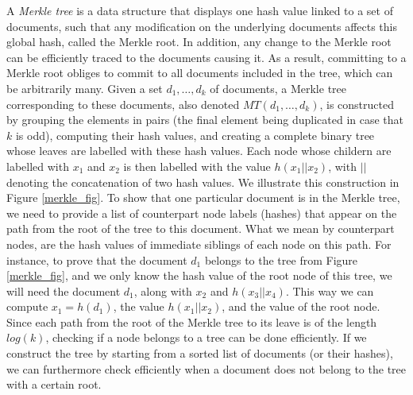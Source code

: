 A {\em Merkle tree} is a data structure that displays one hash value linked to a set of documents, such that any modification on the underlying documents affects this global hash, called the Merkle root. In addition, any change to the Merkle root can be efficiently traced to the documents causing it. As a result, committing to a Merkle root obliges to commit to all documents included in the tree, which can be arbitrarily many. Given a set $d_1,\ldots ,d_k$ of documents, a Merkle tree corresponding to these documents, also denoted $MT(d_1,\ldots ,d_k)$, is constructed by grouping the elements in pairs (the final element being duplicated in case that $k$ is odd), computing their hash values, and creating a complete binary tree whose leaves are labelled with these hash values. Each node whose childern are labelled with $x_1$ and $x_2$ is then labelled with the value $h(x_1 || x_2)$, with $||$ denoting the concatenation of two hash values. We illustrate this construction in Figure \ref{merkle_fig}. To show that one particular document is in the Merkle tree, we need to provide a list of counterpart node labels (hashes) that appear on the path from the root of the tree to this document. What we mean by counterpart nodes, are the hash values of immediate siblings of each node on this path. For instance, to prove that the document $d_1$ belongs to the tree from Figure \ref{merkle_fig}, and we only know the hash value of the root node of this tree, we will need the document $d_1$, along with $x_2$ and $h(x_3||x_4)$. This way we can compute $x_1=h(d_1)$, the value $h(x_1||x_2)$, and the value of the root node. Since each path from the root of the Merkle tree to its leave is of the length $log(k)$, checking if a node belongs to a tree can be done efficiently. If we construct the tree by starting from a sorted list of documents (or their hashes), we can furthermore check  efficiently when a document does not belong to the tree with a certain root.

